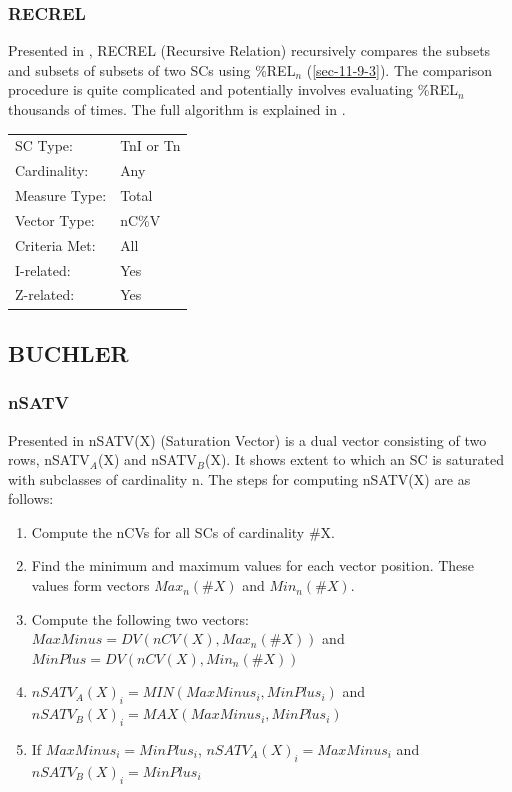 \documentclass{article}
\begin{document}
\subsubsection{RECREL}
\label{sec-11-9-5}

Presented in \citet{Castren1994}, RECREL (Recursive Relation)
recursively compares the subsets and subsets of subsets of two SCs
using \%REL$_{n}$ (\ref{sec-11-9-3}). The comparison procedure is quite
complicated and potentially involves evaluating \%REL$_{n}$ thousands of
times. The full algorithm is explained in \citet[]{Castren1994}.

\begin{center}
\begin{tabular}{ll}
 SC Type:       &  TnI or Tn  \\
 Cardinality:   &  Any        \\
 Measure Type:  &  Total      \\
 Vector Type:   &  nC\%V      \\
 Criteria Met:  &  All        \\
 I-related:     &  Yes        \\
 Z-related:     &  Yes        \\
\end{tabular}
\end{center}
\subsection{BUCHLER}
\label{sec-11-10}
\subsubsection{nSATV}
\label{sec-11-10-1}

Presented in \citet[chap. 2.3]{Buchler1997} nSATV(X) (Saturation
Vector) is a dual vector consisting of two rows, nSATV$_{A}$(X) and
nSATV$_{B}$(X). It shows extent to which an SC is saturated with
subclasses of cardinality n. The steps for computing nSATV(X) are
as follows:

\begin{enumerate}
\item Compute the nCVs for all SCs of cardinality \#X.
\item Find the minimum and maximum values for each vector position. These
   values form vectors $Max_{n}(\#X)$ and $Min_{n}(\#X)$.
\item Compute the following two vectors:
   $MaxMinus=DV(nCV(X),Max_{n}(\#X))$ and $MinPlus=DV(nCV(X),Min_{n}(\#X))$
\item $nSATV_{A}(X)_{i}=MIN(MaxMinus_{i},MinPlus_{i})$ and
   $nSATV_{B}(X)_{i}=MAX(MaxMinus_{i},MinPlus_{i})$
\item If $MaxMinus_{i}=MinPlus_{i}$, $nSATV_{A}(X)_{i}=MaxMinus_{i}$
   and $nSATV_{B}(X)_{i}=MinPlus_{i}$
\end{enumerate}
\end{document}
